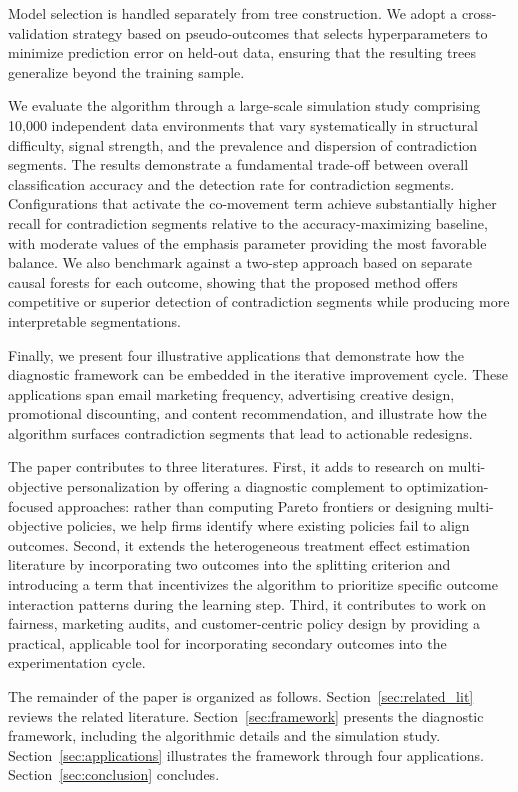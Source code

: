 \documentclass[11pt,letterpaper,english]{article}
\theoremstyle{definition}
\theoremstyle{definition}
\begin{document}
\begin{bibunit}
Model selection is handled separately from tree construction. We adopt a cross-validation strategy based on pseudo-outcomes \citep{wager2018estimation} that selects hyperparameters to minimize prediction error on held-out data, ensuring that the resulting trees generalize beyond the training sample.

We evaluate the algorithm through a large-scale simulation study comprising 10{,}000 independent data environments that vary systematically in structural difficulty, signal strength, and the prevalence and dispersion of contradiction segments. The results demonstrate a fundamental trade-off between overall classification accuracy and the detection rate for contradiction segments. Configurations that activate the co-movement term achieve substantially higher recall for contradiction segments relative to the accuracy-maximizing baseline, with moderate values of the emphasis parameter providing the most favorable balance. We also benchmark against a two-step approach based on separate causal forests for each outcome, showing that the proposed method offers competitive or superior detection of contradiction segments while producing more interpretable segmentations.

Finally, we present four illustrative applications that demonstrate how the diagnostic framework can be embedded in the iterative improvement cycle. These applications span email marketing frequency, advertising creative design, promotional discounting, and content recommendation, and illustrate how the algorithm surfaces contradiction segments that lead to actionable redesigns.

The paper contributes to three literatures. First, it adds to research on multi-objective personalization by offering a diagnostic complement to optimization-focused approaches: rather than computing Pareto frontiers or designing multi-objective policies, we help firms identify where existing policies fail to align outcomes. Second, it extends the heterogeneous treatment effect estimation literature by incorporating two outcomes into the splitting criterion and introducing a term that incentivizes the algorithm to prioritize specific outcome interaction patterns during the learning step. Third, it contributes to work on fairness, marketing audits, and customer-centric policy design by providing a practical, applicable tool for incorporating secondary outcomes into the experimentation cycle.

The remainder of the paper is organized as follows. Section~\ref{sec:related_lit} reviews the related literature. Section~\ref{sec:framework} presents the diagnostic framework, including the algorithmic details and the simulation study. Section~\ref{sec:applications} illustrates the framework through four applications. Section~\ref{sec:conclusion} concludes.



\end{bibunit}
\end{document}
